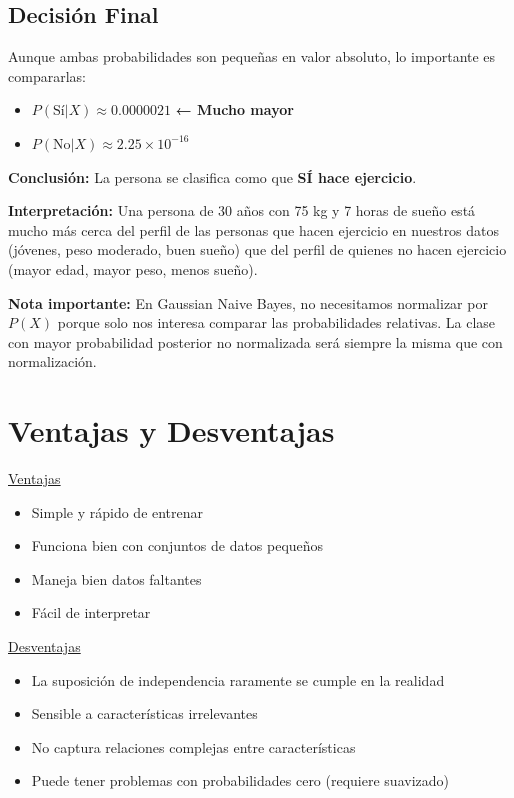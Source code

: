 \documentclass[12pt]{article}
\begin{document}
\subsection{Decisión Final}
Aunque ambas probabilidades son pequeñas en valor absoluto, lo importante es compararlas:

\begin{itemize}
    \item $P(\text{Sí}|X) \approx 0.0000021$ \textbf{← Mucho mayor}
    \item $P(\text{No}|X) \approx 2.25 \times 10^{-16}$
\end{itemize}

\textbf{Conclusión:} La persona se clasifica como que \textbf{SÍ hace ejercicio}.

\vspace{0.5em}

\textbf{Interpretación:} Una persona de 30 años con 75 kg y 7 horas de sueño está mucho más cerca del perfil de las personas que hacen ejercicio en nuestros datos (jóvenes, peso moderado, buen sueño) que del perfil de quienes no hacen ejercicio (mayor edad, mayor peso, menos sueño).

\vspace{0.5em}

\textbf{Nota importante:} En Gaussian Naive Bayes, no necesitamos normalizar por $P(X)$ porque solo nos interesa comparar las probabilidades relativas. La clase con mayor probabilidad posterior no normalizada será siempre la misma que con normalización.

\section{Ventajas y Desventajas}
\underline{Ventajas}
\begin{itemize}
    \item Simple y rápido de entrenar
    \item Funciona bien con conjuntos de datos pequeños
    \item Maneja bien datos faltantes
    \item Fácil de interpretar
\end{itemize}

\underline{Desventajas}
\begin{itemize}
    \item La suposición de independencia raramente se cumple en la realidad
    \item Sensible a características irrelevantes
    \item No captura relaciones complejas entre características
    \item Puede tener problemas con probabilidades cero (requiere suavizado)
\end{itemize}
\end{document}
